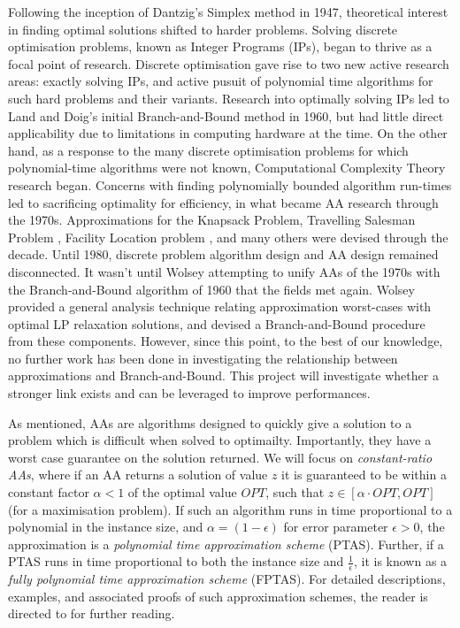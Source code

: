 \documentclass[12pt, a4paper]{article}
\begin{document}
Following the inception of Dantzig's \cite{Dantzig} Simplex method in 1947, theoretical interest in finding optimal solutions shifted to harder problems. Solving discrete optimisation problems, known as Integer Programs (IPs), began to thrive as a focal point of research. Discrete optimisation gave rise to two new active research areas: exactly solving IPs, and active pusuit of polynomial time algorithms for such hard problems and their variants. Research into optimally solving IPs led to Land and Doig's initial Branch-and-Bound method \cite{LandDoig} in 1960, but had little direct applicability due to limitations in computing hardware at the time. On the other hand, as a response to the many discrete optimisation problems for which polynomial-time algorithms were not known, Computational Complexity Theory research began\cite{Cook}. Concerns with finding polynomially bounded algorithm run-times led to sacrificing optimality for efficiency, in what became AA research through the 1970s. Approximations for the Knapsack Problem\cite{IbarraKim}, Travelling Salesman Problem \cite{CristofidesTSP}, Facility Location problem \cite{CornuejolsFisherNemhauser}, and many others were devised through the decade. Until 1980, discrete problem algorithm design and AA design remained disconnected. It wasn't until Wolsey \cite{WOLSEY} attempting to unify AAs of the 1970s with the Branch-and-Bound algorithm of 1960 that the fields met again. Wolsey provided a general analysis technique relating approximation worst-cases with optimal LP relaxation solutions, and devised a Branch-and-Bound procedure from these components. However, since this point, to the best of our knowledge, no further work has been done in investigating the relationship between approximations and Branch-and-Bound. This project will investigate whether a stronger link exists and can be leveraged to improve performances. 

As mentioned, AAs are algorithms designed to quickly give a solution to a problem which is difficult when solved to optimailty. Importantly, they have a worst case guarantee on the solution returned. We will focus on \emph{constant-ratio AAs}, where if an AA returns a solution of value $z$ it is guaranteed to be within a constant factor $\alpha < 1$ of the optimal value $OPT$, such that $z \in [\alpha \cdot OPT, OPT]$ (for a maximisation problem). If such an algorithm runs in time proportional to a polynomial in the instance size, and $\alpha = (1-\epsilon)$ for error parameter $\epsilon > 0$, the approximation is a \emph{polynomial time approximation scheme} (PTAS). Further, if a PTAS runs in time proportional to both the instance size and $\frac{1}{\epsilon}$, it is known as a \emph{fully polynomial time approximation scheme} (FPTAS). For detailed descriptions, examples, and associated proofs of such approximation schemes, the reader is directed to \cite{BOOK:2} for further reading.
\end{document}
